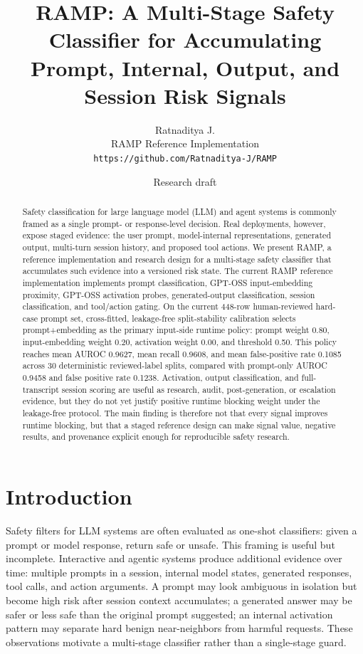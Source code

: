 \documentclass[11pt]{article}
\title{RAMP: A Multi-Stage Safety Classifier for Accumulating Prompt, Internal, Output, and Session Risk Signals}
\author{
Ratnaditya J.\\
RAMP Reference Implementation\\
\texttt{https://github.com/Ratnaditya-J/RAMP}
}
\date{Research draft}
\begin{document}
\maketitle

\begin{abstract}
Safety classification for large language model (LLM) and agent systems is commonly framed as a
single prompt- or response-level decision. Real deployments, however, expose staged evidence:
the user prompt, model-internal representations, generated output, multi-turn session history, and
proposed tool actions. We present RAMP, a reference implementation and research design for a
multi-stage safety classifier that accumulates such evidence into a versioned risk state. The
current RAMP reference implementation implements prompt classification, GPT-OSS input-embedding
proximity, GPT-OSS activation probes, generated-output classification, session classification, and
tool/action gating. On the current 448-row human-reviewed hard-case prompt set, cross-fitted,
leakage-free split-stability calibration selects prompt+embedding as the primary input-side runtime
policy: prompt weight 0.80, input-embedding weight 0.20, activation weight 0.00, and threshold 0.50.
This policy reaches mean AUROC 0.9627, mean recall 0.9608, and mean false-positive rate 0.1085
across 30 deterministic reviewed-label splits, compared with prompt-only AUROC 0.9458 and false
positive rate 0.1238. Activation, output classification, and full-transcript session scoring are
useful as research, audit, post-generation, or escalation evidence, but they do not yet justify
positive runtime blocking weight under the leakage-free protocol. The main
finding is therefore not that every signal improves runtime blocking, but that a staged reference design can
make signal value, negative results, and provenance explicit enough for reproducible safety research.
\end{abstract}

\section{Introduction}

Safety filters for LLM systems are often evaluated as one-shot classifiers: given a prompt or model
response, return safe or unsafe. This framing is useful but incomplete. Interactive and agentic
systems produce additional evidence over time: multiple prompts in a session, internal model states,
generated responses, tool calls, and action arguments. A prompt may look ambiguous in isolation but
become high risk after session context accumulates; a generated answer may be safer or less safe
than the original prompt suggested; an internal activation pattern may separate hard benign
near-neighbors from harmful requests. These observations motivate a multi-stage classifier rather
than a single-stage guard.
\end{document}
